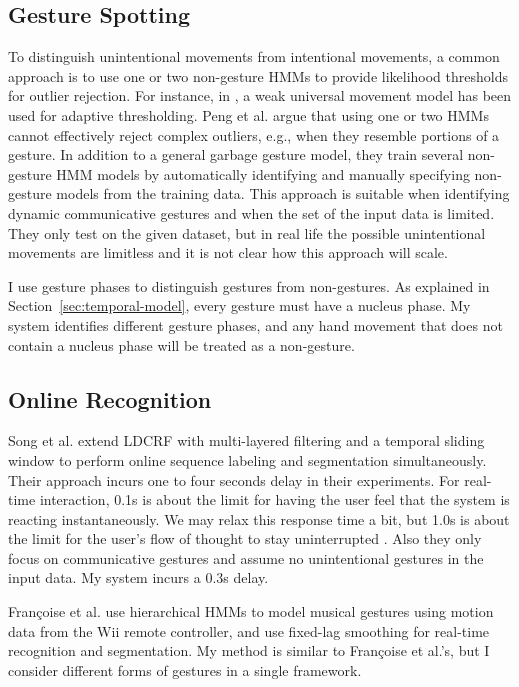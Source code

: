 \subsection{Gesture Spotting}
To distinguish unintentional movements from intentional
movements, a common approach is to use one or two non-gesture HMMs to
provide likelihood thresholds for outlier rejection. For instance, in \cite{yang07}, a weak
universal movement model has been used for adaptive thresholding.
Peng et al. \cite{peng11} argue that using one or two HMMs cannot
effectively reject complex outliers, e.g., when they resemble portions of a
gesture. In addition to a general garbage gesture model, they train several
non-gesture HMM models by automatically identifying and manually specifying
non-gesture models from the training data. This approach is suitable when
identifying dynamic communicative gestures and when the set of the input data is limited. They only test on the
given dataset, but in real life the possible unintentional movements are
limitless and it is not clear how this approach will scale. 

I use gesture phases to distinguish gestures from non-gestures. As explained in
Section~\ref{sec:temporal-model}, every gesture must have a nucleus phase.
My system identifies different gesture phases, and any hand movement that does
not contain a nucleus phase will be treated as a non-gesture.

\subsection{Online Recognition}
Song et al. \cite{song12} extend LDCRF with multi-layered
filtering and a temporal sliding window to perform online sequence labeling and
segmentation simultaneously.
Their approach incurs one to four seconds delay in their
experiments. For real-time interaction, 0.1s is about the limit for having the
user feel that the system is reacting instantaneously. We may relax this response time a
bit, but 1.0s is about the limit for the user's flow of thought to stay
uninterrupted \cite{card91}.  Also they only focus on communicative
gestures and assume no unintentional gestures in the input data. My system
incurs a 0.3s delay.

Fran{\c{c}}oise et al. \cite{francoise11} use hierarchical HMMs to model musical
gestures using motion data from the Wii remote controller, and use fixed-lag
smoothing for real-time recognition and segmentation.
My method is similar to Fran{\c{c}}oise et al.'s, but I consider different
forms of gestures in a single framework.


